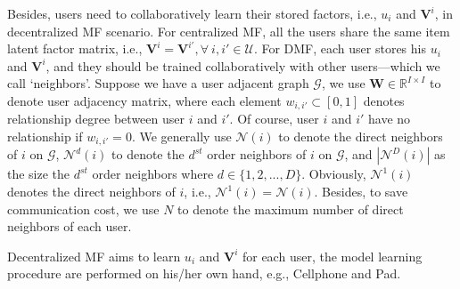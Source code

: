 Besides, users need to collaboratively learn their stored factors, i.e., $u_i$ and $\textbf{V}^i$, in decentralized MF scenario. 
For centralized MF, all the users share the same item latent factor matrix, i.e., $\textbf{V}^i=\textbf{V}^{i'}, \forall ~ i,i' \in \mathcal{U}$. %
For DMF, each user stores his $u_i$ and $\textbf{V}^i$, and they should be trained collaboratively with other users---which we call `neighbors'. 
Suppose we have a user adjacent graph $\mathcal{G}$, we use $\textbf{W}\in \mathbb{R}^{I\times{}I}$ to denote user adjacency matrix, where each element $w_{i,i'} \subset [0, 1]$ denotes relationship degree between user $i$ and $i'$. Of course, user $i$ and $i'$ have no relationship if $w_{i,i'}=0$. 
We generally use $\mathcal{N}(i)$ to denote the direct neighbors of $i$ on $\mathcal{G}$, $\mathcal{N}^d(i)$ to denote the $d^{st}$ order neighbors of $i$ on $\mathcal{G}$, and $|\mathcal{N}^D(i)|$ as the size the $d^{st}$ order neighbors where $d \in \{1,2,...,D\}$. 
Obviously, $\mathcal{N}^1(i)$ denotes the direct neighbors of $i$, i.e., $\mathcal{N}^1(i)=\mathcal{N}(i)$. 
Besides, to save communication cost, we use $N$ to denote the maximum number of direct neighbors of each user. 

Decentralized MF aims to learn $u_i$ and $\textbf{V}^i$ for each user, the model learning procedure are performed on his/her own hand, e.g., Cellphone and Pad.

